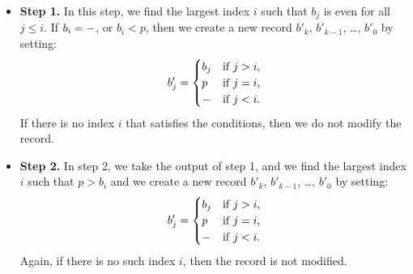 \begin{itemize}
\item \textbf{Step 1.} In this step, we find the largest index $i$
such that $b_j$ is even for all $j \le i$. If $b_i = \mathtt{-}$, or $b_i < p$,
then we create a new record $b'_k$, $b'_{k-1}$, \dots, $b'_0$ by
setting:
\begin{equation*}
b'_j = \begin{cases}
b_j & \text{if $j > i$,} \\
p & \text{if $j = i$,} \\
\mathtt{-} & \text{if $j < i$.} 
\end{cases}
\end{equation*}
If there is no index $i$ that satisfies the conditions, then we do not modify
the record.

\item \textbf{Step 2.} In step 2, we take the output of step 1, and we find the
largest index $i$ such that $p > b_i$ and we create a new record $b'_k$,
$b'_{k-1}$, \dots, $b'_0$ by setting:
\begin{equation*}
b'_j = \begin{cases}
b_j & \text{if $j > i$,} \\
p & \text{if $j = i$,} \\
\mathtt{-} & \text{if $j < i$.} 
\end{cases}
\end{equation*}
Again, if there is no such index $i$, then the record is not modified.
\end{itemize}

